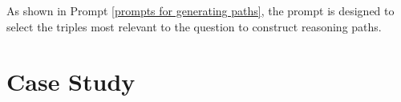 As shown in Prompt \ref{prompts for generating paths}, the prompt is designed to select the triples most relevant to the question to construct reasoning paths. 





\section{Case Study} \label{appendix:case study}
